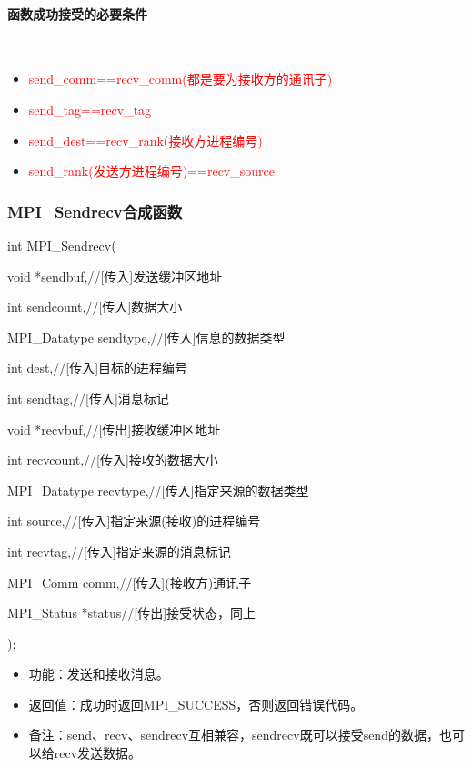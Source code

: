\documentclass[UTF8]{article}%
\begin{document}
\paragraph{函数成功接受的必要条件}~{}

\begin{itemize}
    \item \textcolor{red}{send\_comm==recv\_comm(都是要为接收方的通讯子)}
    \item \textcolor{red}{send\_tag==recv\_tag}
    \item \textcolor{red}{send\_dest==recv\_rank(接收方进程编号)}
    \item \textcolor{red}{send\_rank(发送方进程编号)==recv\_source}
\end{itemize}

\subsubsection{MPI\_Sendrecv合成函数}

int MPI\_Sendrecv(
  
    \qquad void         *sendbuf,//[传入]发送缓冲区地址
    
    \qquad int          sendcount,//[传入]数据大小

    \qquad MPI\_Datatype sendtype,//[传入]信息的数据类型

    \qquad int          dest,//[传入]目标的进程编号

    \qquad int          sendtag,//[传入]消息标记

    \qquad void         *recvbuf,//[传出]接收缓冲区地址

    \qquad int          recvcount,//[传入]接收的数据大小

    \qquad MPI\_Datatype recvtype,//[传入]指定来源的数据类型

    \qquad int          source,//[传入]指定来源(接收)的进程编号

    \qquad int          recvtag,//[传入]指定来源的消息标记

    \qquad MPI\_Comm     comm,//[传入](接收方)通讯子

    \qquad MPI\_Status   *status//[传出]接受状态，同上

);

\begin{itemize}
    \item 功能：发送和接收消息。
    \item 返回值：成功时返回MPI\_SUCCESS，否则返回错误代码。
    \item 备注：send、recv、sendrecv互相兼容，sendrecv既可以接受send的数据，也可以给recv发送数据。
\end{itemize}
\end{document}
